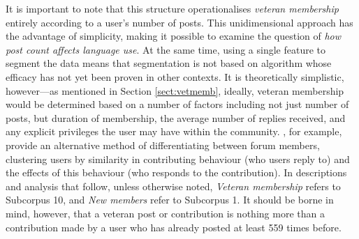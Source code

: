 \documentclass{article}
\begin{document}
It is important to note that this structure operationalises \emph{veteran membership} entirely according to a user's number of posts. This unidimensional approach has the advantage of simplicity, making it possible to examine the question of \emph{how post count affects language use}. At the same time, using a single feature to segment the data means that segmentation is not based on algorithm whose efficacy has not yet been proven in other contexts. It is theoretically simplistic, however---as mentioned in Section \ref{sect:vetmemb}, ideally, veteran membership would be determined based on a number of factors including not just number of posts, but duration of membership, the average number of replies received, and any explicit privileges the user may have within the community. \textcite{pfeil_social_2011}, for example, provide an alternative method of differentiating between forum members, clustering users by similarity in contributing behaviour (who users reply to) and the effects of this behaviour (who responds to the contribution). In descriptions and analysis that follow, unless otherwise noted, \emph{Veteran membership} refers to Subcorpus 10, and \emph{New members} refer to Subcorpus 1. It should be borne in mind, however, that a veteran post or contribution is nothing more than a contribution made by a user who has already posted at least 559 times before.
\end{document}
